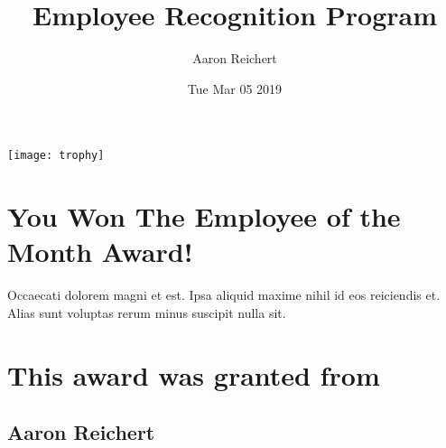 \documentclass[12pt, letterpaper]{article}
\title{Employee Recognition Program}
\author{Aaron Reichert}
\date{Tue Mar 05 2019}
\begin{document}
\maketitle
\begin{center}
\texttt{[image: trophy]}
\section*{You Won The Employee of the Month Award!}
Occaecati dolorem magni et est. Ipsa aliquid maxime nihil id eos reiciendis et. Alias sunt voluptas rerum minus suscipit nulla sit.
\section*{This award was granted from}
\subsection*{Aaron Reichert}
\end{center}
\end{document}
